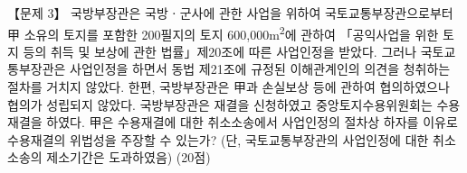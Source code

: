 \begin{longquestion}{【문제 3】}
국방부장관은 국방ㆍ군사에 관한 사업을 위하여 국토교통부장관으로부터 甲 소유의 토지를 포함한 200필지의 토지 600,000m\textsuperscript{2}에 관하여 「공익사업을 위한 토지 등의 취득 및 보상에 관한 법률」제20조에 따른 사업인정을 받았다. 그러나 국토교통부장관은 사업인정을 하면서 동법 제21조에 규정된 이해관계인의 의견을 청취하는 절차를 거치지 않았다. 한편, 국방부장관은 甲과 손실보상 등에 관하여 협의하였으나 협의가 성립되지 않았다. 국방부장관은 재결을 신청하였고 중앙토지수용위원회는 수용재결을 하였다. 甲은 수용재결에 대한 취소소송에서 사업인정의 절차상 하자를 이유로 수용재결의 위법성을 주장할 수 있는가? (단, 국토교통부장관의 사업인정에 대한 취소소송의 제소기간은 도과하였음) (20점) \par
\end{longquestion}
